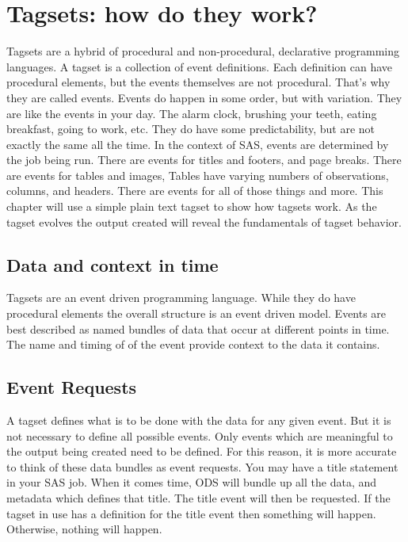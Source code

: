 
\chapter{Tagsets: how do they work?}
Tagsets are a hybrid of procedural and non-procedural, declarative
programming languages.  A tagset is a collection of event definitions.
Each definition can have procedural elements, but the events themselves
are not procedural.  That's why they are called events.  Events do happen
in some order, but with variation.  They are like the events in your
day.  The alarm clock, brushing your teeth, eating breakfast, going
to work, etc.  They do have some predictability, but are not exactly
the same all the time.  In the context of SAS, events are determined
by the job being run.  There are events for titles and footers, and
page breaks.  There are events for tables and images,  Tables have
varying numbers of observations, columns, and headers.  There are
events for all of those things and more. This chapter will use a 
simple plain text tagset to show how tagsets work.  As the tagset
evolves the output created will reveal the fundamentals of tagset
behavior.

\section{Data and context in time}

Tagsets are an event driven programming language.
While they do have procedural elements the overall
structure is an event driven model.  Events are best
described as named bundles of data that occur at
different points in time.  The name and timing of
of the event provide context to the data it contains.

\section{Event Requests}
A tagset defines what is to be done with the data
for any given event.  But it is not necessary to
define all possible events.  Only events which are
meaningful to the output being created
need to be defined.  For this reason, it is more
accurate to think of these data bundles as event
requests.  You may have a title statement in your
SAS job.
When it comes time, ODS will bundle up all the data,
and metadata which defines that title.  The title
event will then be requested.  If the tagset in use has
a definition for the title event then something will
happen.  Otherwise, nothing will happen.

